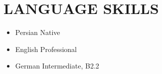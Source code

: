\documentclass[10pt,a4paper,sans]{moderncv} %
\begin{document}
	\section{LANGUAGE SKILLS}
	\begin{itemize}
	\item Persian \hspace{5 pt} Native
	\item English \hspace{6 pt} Professional
	\item German \hspace{5 pt} Intermediate, B2.2
	\end{itemize}

\end{document}
